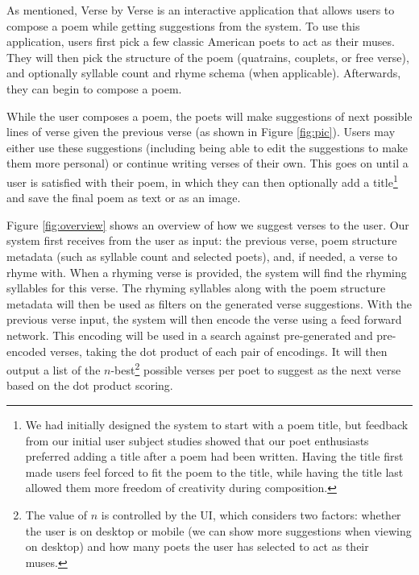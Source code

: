 \documentclass[11pt]{article}
\begin{document}
As mentioned, Verse by Verse is an interactive application that allows users to compose a poem while getting suggestions from the system.
To use this application, users first pick a few classic American poets to act as their muses.
They will then pick the structure of the poem (quatrains, couplets, or free verse), and optionally syllable count and rhyme schema (when applicable).
Afterwards, they can begin to compose a poem.

While the user composes a poem, the poets will make suggestions of next possible lines of verse given the previous verse (as shown in Figure \ref{fig:pic}).
Users may either use these suggestions (including being able to edit the suggestions to make them more personal) or continue writing verses of their own.
This goes on until a user is satisfied with their poem, in which they can then optionally add a title\footnote{We had initially designed the system to start with a poem title, but feedback from our initial user subject studies showed that our poet enthusiasts preferred adding a title after a poem had been written. Having the title first made users feel forced to fit the poem to the title, while having the title last allowed them more freedom of creativity during composition.} and save the final poem as text or as an image.




Figure \ref{fig:overview} shows an overview of how we suggest verses to the user.
Our system first receives from the user as input: the previous verse, poem structure metadata (such as syllable count and selected poets), and, if needed, a verse to rhyme with.
When a rhyming verse is provided, the system will find the rhyming syllables for this verse.
The rhyming syllables along with the poem structure metadata will then be used as filters on the generated verse suggestions.
With the previous verse input, the system will then encode the verse using a feed forward network.
This encoding will be used in a search against pre-generated and pre-encoded verses, taking the dot product of each pair of encodings.
It will then output a list of the $n$-best\footnote{The value of $n$ is controlled by the UI, which considers two factors: whether the user is on desktop or mobile (we can show more suggestions when viewing on desktop) and how many poets the user has selected to act as their muses.} possible verses per poet to suggest as the next verse based on the dot product scoring.
\end{document}
